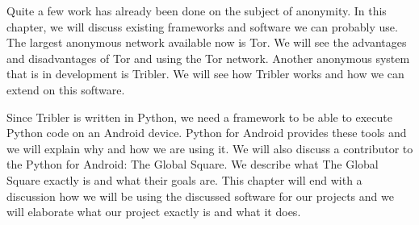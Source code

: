 Quite a few work has already been done on the subject of anonymity. In this chapter, we will discuss existing frameworks and software we can probably use. The largest anonymous network available now is Tor. We will see the advantages and disadvantages of Tor and using the Tor network. Another anonymous system that is in development is Tribler. We will see how Tribler works and how we can extend on this software.
	
Since Tribler is written in Python, we need a framework to be able to execute Python code on an Android device. Python for Android provides these tools and we will explain why and how we are using it. We will also discuss a contributor to the Python for Android: The Global Square. We describe what The Global Square exactly is and what their goals are. This chapter will end with a discussion how we will be using the discussed software for our projects and we will elaborate what our project exactly is and what it does.